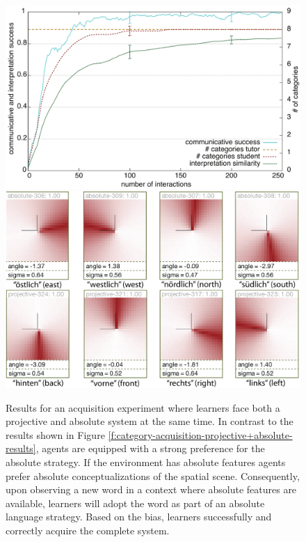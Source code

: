 \begin{figure} 
\begin{center}
\includegraphics[width=0.8\columnwidth]{figs/category-acquisition-projective+absolute-biased-results+categories-1}
\includegraphics[width=0.8\columnwidth]{figs/category-acquisition-projective+absolute-biased-results+categories-2.png}
\end{center}
\caption[Preference based acquisition of proximal and absolute systems]{
Results for an acquisition experiment where learners face 
both a projective and absolute system
at the same time. In contrast to the results shown in Figure \ref{f:category-acquisition-projective+absolute-results}, agents are equipped with a strong preference for the absolute strategy. If the environment
has absolute features agents prefer absolute conceptualizations of the spatial scene. 
Consequently, upon observing a new word in a context where absolute features are available, learners 
will adopt the word as part of an absolute language strategy. Based
on the bias, learners successfully and correctly acquire the complete system.}
\label{f:category-acquisition-projective+absolute-biased-results}
\end{figure}



